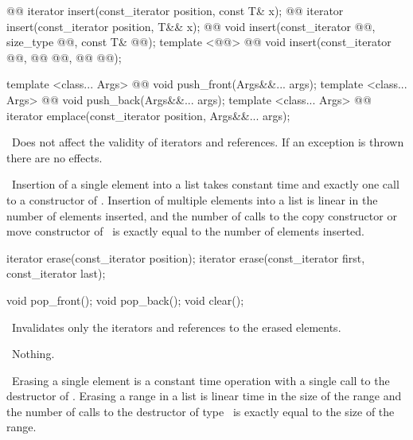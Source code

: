 \documentclass[american,twoside]{book}
\begin{document}
%
\begin{itemdecl}
@@ 
  iterator insert(const_iterator position, const T& x);
@@ 
  iterator insert(const_iterator position, T&& x);
@@ 
  void insert(const_iterator @@, size_type @@, const T& @@);
template <@@>
  @@
  void insert(const_iterator @@, @@ @@,
              @@ @@);

template <class... Args> 
  @@
  void push_front(Args&&... args);
template <class... Args> 
  @@
  void push_back(Args&&... args);
template <class... Args> 
  @@
  iterator emplace(const_iterator position, Args&&... args);
\end{itemdecl}

\begin{itemdescr}
\pnum
\notes\ 
Does not affect the validity of iterators and references.
If an exception is thrown there are no effects.

\pnum
\complexity\ 
Insertion of a single element into a list takes constant time and
exactly one call to a constructor of
. Insertion of multiple elements into a list is linear in the
number of elements inserted, and the number of calls to the copy
constructor or move constructor of \tcode{T}\ is exactly equal
to the number of elements inserted.
\end{itemdescr}

%
\begin{itemdecl}
iterator erase(const_iterator position);
iterator erase(const_iterator first, const_iterator last);

void pop_front();
void pop_back();
void clear();
\end{itemdecl}

\begin{itemdescr}
\pnum
\effects\ 
Invalidates only the iterators and references to the erased elements.

\pnum
\throws\ 
Nothing.

\pnum
\complexity\ 
Erasing a single element is a constant time operation with a single call to the destructor of
\tcode{T}.
Erasing a range in a list is linear time in the
size of the range and the number of calls to the destructor of type
\tcode{T}\
is exactly equal to the size of the range.
\end{itemdescr}
\end{document}

